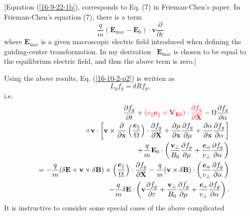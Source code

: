 \documentclass{article}
\newcommand{\tmcolor}[2]{{\color{#1}{#2}}}
\newcommand{\tmmathbf}[1]{\ensuremath{\boldsymbol{#1}}}
\newcommand{\tmop}[1]{\ensuremath{\operatorname{#1}}}
\begin{document}
[Equation (\ref{16-9-22-1b}), corresponds to Eq. (7) in Frieman-Chen's
paper{\cite{frieman1982}}. In Frieman-Chen's equation (7), there is a term
\[ \frac{q}{m} (\mathbf{E}_{\tmop{mac}} -\mathbf{E}_0) \cdot \mathbf{v}
   \frac{\partial}{\partial \varepsilon} \]
where $\mathbf{E}_{\tmop{mac}}$ is a given macroscopic electric field
introduced when defining the guiding-center transformation. In my derivation \
$\mathbf{E}_{\tmop{mac}}$ is chosen to be equal to the equilibrium electric
field, and thus the above term is zero.]

Using the above results, Eq. (\ref{16-10-2-p2}) is written as
\begin{equation}
  \label{16-9-22-p1} L_g f_g = \delta R f_g,
\end{equation}
i.e.
\begin{eqnarray}
  &  & \frac{\partial f_g}{\partial t} + \tmcolor{red}{(v_{\parallel}
  \mathbf{e}_{\parallel} +\mathbf{V}_{\mathbf{E}0}) \cdot \frac{\partial
  f_g}{\partial \mathbf{X}}} - \Omega \frac{\partial f_g}{\partial \alpha}
  \nonumber\\
  &  & +\mathbf{v} \cdot \left[ \mathbf{v} \times \frac{\partial}{\partial
  \mathbf{x}} \left( \frac{\tmmathbf{e}_{\parallel}}{\Omega} \right) \cdot
  \frac{\partial f_g}{\partial \mathbf{X}} + \frac{\partial \mu}{\partial
  \mathbf{x}}  \frac{\partial f_g}{\partial \mu} + \frac{\partial
  \alpha}{\partial \mathbf{x}}  \frac{\partial f_g}{\partial \alpha} \right]
  \nonumber\\
  &  & + \frac{q}{m} \mathbf{E}_0 \cdot \left( \frac{\mathbf{v}_{\perp}}{B_0}
  \frac{\partial f_g}{\partial \mu} + \frac{\tmmathbf{e}_{\alpha}}{v_{\perp}}
  \frac{\partial f_g}{\partial \alpha} \right) \nonumber\\
  &  & = - \frac{q}{m} (\delta \mathbf{E}+\mathbf{v} \times \delta
  \mathbf{B}) \times \left( \frac{\tmmathbf{e}_{\parallel}}{\Omega}  \right)
  \cdot \frac{\partial f_g}{\partial \mathbf{X}} - \frac{q}{m} (\mathbf{v}
  \times \delta \mathbf{B}) \cdot \left(
  \frac{\tmmathbf{e}_{\alpha}}{v_{\perp}}  \frac{\partial f_g}{\partial
  \alpha} \right) \nonumber\\
  &  & - \frac{q}{m} \delta \mathbf{E} \cdot \left( \mathbf{v} \frac{\partial
  f_g}{\partial \varepsilon} + \frac{\mathbf{v}_{\perp}}{B_0}  \frac{\partial
  f_g}{\partial \mu} + \frac{\tmmathbf{e}_{\alpha}}{v_{\perp}}  \frac{\partial
  f_g}{\partial \alpha} \right) .  \label{18-12-16-1}
\end{eqnarray}
It is instructive to consider some special cases of the above complicated
\end{document}
